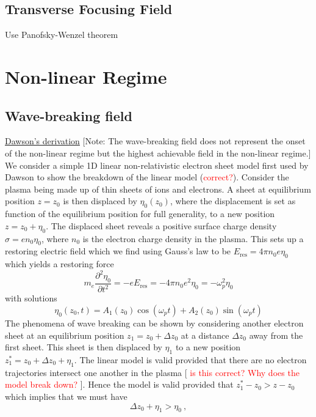 \subsection{Transverse Focusing Field} 
Use Panofsky-Wenzel theorem


\clearpage
\section{Non-linear Regime} 
\subsection{Wave-breaking field}
\underline{Dawson's derivation} [Note: The wave-breaking field does not represent the onset of the non-linear regime but the highest achievable field in the non-linear regime.]
We consider a simple 1D linear non-relativistic electron sheet model first used by Dawson \citep{Dawson1959} to show the breakdown of the linear model (\textcolor{red}{correct?}). Consider the plasma being made up of thin sheets of ions and electrons. A sheet at equilibrium position $z=z_0$ is then displaced by $\eta_0(z_0)$, where the displacement is set as function of the equilibrium position for full generality, to a new position $z=z_0+\eta_0$. The displaced sheet reveals a positive surface charge density $\sigma=en_0\eta_0$, where $n_0$ is the electron charge density in the plasma. This sets up a restoring electric field which we find using Gauss's law to be $E_{\text{res}}=4\pi n_0e\eta_0$ which yields a restoring force
\begin{equation}
 m_e\frac{\partial^2\eta_0}{\partial t^2}=-eE_{\text{res}}=-4\pi n_0e^2\eta_0=-\omega_p^2\eta_0
 \end{equation} 
 with solutions 
 \begin{equation}
 \eta_0(z_0,t)=A_1(z_0)\cos(\omega_p t)+A_2(z_0)\sin(\omega_p t)
 \end{equation}
The phenomena of wave breaking can be shown by considering another electron sheet at an equilibrium position $z_1=z_0+\Delta z_0$ at a distance $\Delta z_0$ away from the first sheet. This sheet is then displaced by $\eta_1$ to a new position $z^{*}_1=z_0+\Delta z_0+\eta_1$. The linear model is valid provided that there are no electron trajectories intersect one another in the plasma [ \textcolor{red}{is this correct? Why does the model break down?} ]. Hence the model is valid provided that $z^{*}_1-z_0>z-z_0$ which implies that we must have
\begin{equation}
\Delta z_0+\eta_1>\eta_0~,
\label{eta_ineq}
\end{equation}
